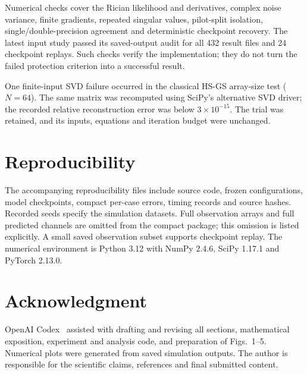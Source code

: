 \documentclass[journal]{IEEEtran}
\begin{document}
Numerical checks cover the Rician likelihood and derivatives, complex
noise variance, finite gradients, repeated singular values, pilot-split
isolation, single/double-precision agreement and deterministic checkpoint
recovery. The latest input study passed its saved-output audit for all
432 result files and 24 checkpoint replays. Such checks verify the
implementation; they do not turn the failed protection criterion into
a successful result.

One finite-input SVD failure occurred in the classical HS-GS array-size
test ($N=64$). The same matrix was recomputed using SciPy's alternative
SVD driver; the recorded relative reconstruction error was below
$3\times10^{-15}$. The trial was retained, and its inputs, equations and
iteration budget were unchanged.

\section*{Reproducibility}
The accompanying reproducibility files include source code, frozen
configurations, model checkpoints, compact per-case errors, timing records
and source hashes. Recorded seeds specify the simulation datasets.
Full observation arrays and full predicted channels are omitted from
the compact package; this omission is listed explicitly. A small saved
observation subset supports checkpoint replay. The numerical environment
is Python 3.12 with NumPy 2.4.6, SciPy 1.17.1 and PyTorch 2.13.0.

\newpage
\section*{Acknowledgment}
OpenAI Codex~\cite{codex2026} assisted with drafting and revising all
sections, mathematical exposition, experiment and analysis code, and
preparation of Figs.~1--5. Numerical plots were generated from saved
simulation outputs. The author is responsible for the scientific claims,
references and final submitted content.



\end{document}
